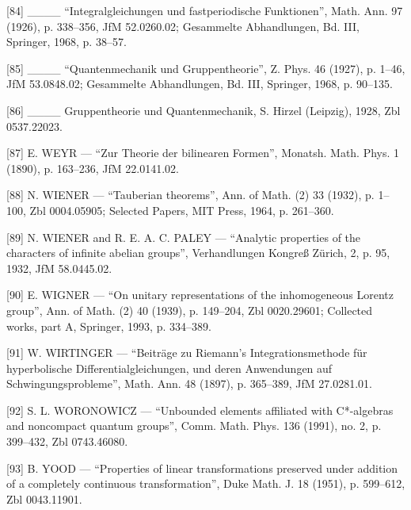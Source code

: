 {[}84{]} \_\_\_\_ “Integralgleichungen und fastperiodische Funktionen”, Math. Ann. 97 (1926), p. 338–356, JfM 52.0260.02; Gesammelte Abhandlungen, Bd. III, Springer, 1968, p. 38–57.

{[}85{]} \_\_\_\_ “Quantenmechanik und Gruppentheorie”, Z. Phys. 46 (1927), p. 1–46, JfM 53.0848.02; Gesammelte Abhandlungen, Bd. III, Springer, 1968, p. 90–135.

{[}86{]} \_\_\_\_ Gruppentheorie und Quantenmechanik, S. Hirzel (Leipzig), 1928, Zbl 0537.22023.

{[}87{]} E. WEYR — “Zur Theorie der bilinearen Formen”, Monatsh. Math. Phys. 1 (1890), p. 163–236, JfM 22.0141.02.

{[}88{]} N. WIENER — “Tauberian theorems”, Ann. of Math. (2) 33 (1932), p. 1–100, Zbl 0004.05905; Selected Papers, MIT Press, 1964, p. 261–360.

{[}89{]} N. WIENER and R. E. A. C. PALEY — “Analytic properties of the characters of infinite abelian groups”, Verhandlungen Kongreß Zürich, 2, p. 95, 1932, JfM 58.0445.02.

{[}90{]} E. WIGNER — “On unitary representations of the inhomogeneous Lorentz group”, Ann. of Math. (2) 40 (1939), p. 149–204, Zbl 0020.29601; Collected works, part A, Springer, 1993, p. 334–389.

{[}91{]} W. WIRTINGER — “Beiträge zu Riemann's Integrationsmethode für hyperbolische Differentialgleichungen, und deren Anwendungen auf Schwingungsprobleme”, Math. Ann. 48 (1897), p. 365–389, JfM 27.0281.01.

{[}92{]} S. L. WORONOWICZ — “Unbounded elements affiliated with C*-algebras and noncompact quantum groups”, Comm. Math. Phys. 136 (1991), no. 2, p. 399–432, Zbl 0743.46080.

{[}93{]} B. YOOD — “Properties of linear transformations preserved under addition of a completely continuous transformation”, Duke Math. J. 18 (1951), p. 599–612, Zbl 0043.11901.


